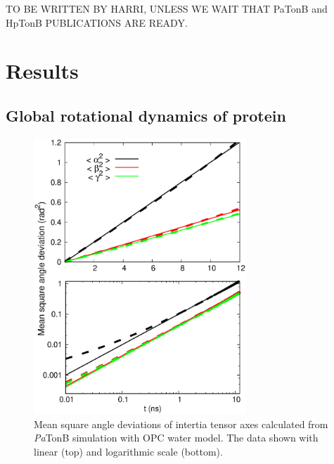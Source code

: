 \documentclass[pre,aps,floatfix,authordate1-4,twocolumn]{revtex4-1}
\begin{document}
TO BE WRITTEN BY HARRI, UNLESS WE WAIT THAT PaTonB and HpTonB PUBLICATIONS
ARE READY.

\section{Results}

\subsection{Global rotational dynamics of protein}
\begin{figure}[htb]
  \includegraphics[width=8.0cm]{../Figs/RMASDplotPsTonBOPC4.eps}%
  \caption{Mean square angle deviations of intertia tensor axes calculated from
    {\it Pa}TonB simulation with OPC water model. The data shown with linear (top) and logarithmic scale (bottom).
    \label{RMASDplot}}%
\end{figure}
\end{document}
